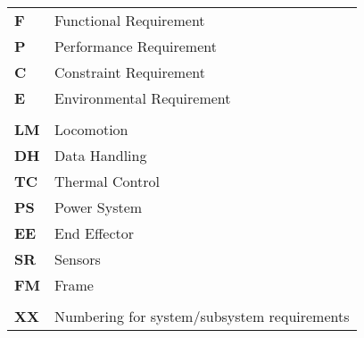 \begin{tabular}{ll}
\textbf{F}	&	Functional Requirement	\\
\textbf{P}	&	Performance Requirement	\\
\textbf{C}	&	Constraint Requirement	\\
\textbf{E}	&	Environmental Requirement	\\
\\
\textbf{LM}	&	Locomotion		\\
\textbf{DH}	&	Data Handling	\\
\textbf{TC}	&	Thermal Control	\\
\textbf{PS}	&	Power System	\\
\textbf{EE}	&	End Effector	\\
\textbf{SR}	&	Sensors			\\
\textbf{FM}	&	Frame			\\
\\
\textbf{XX}	&	Numbering for system/subsystem requirements\\
\end{tabular}\\

\vspace*{\fill}

